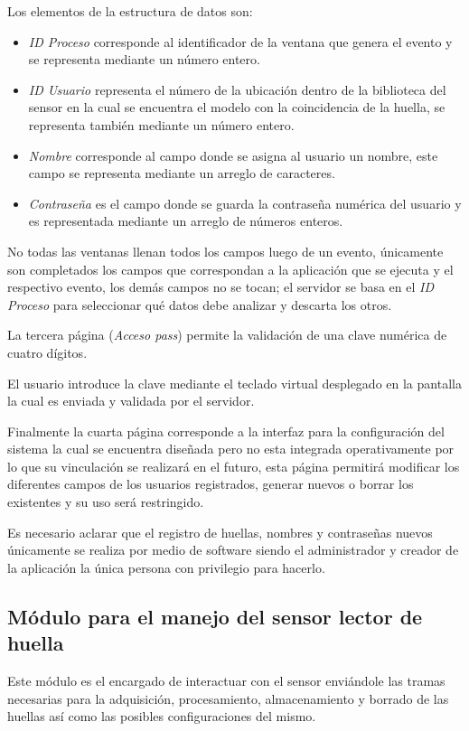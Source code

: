 Los elementos de la estructura de datos son:
\begin{itemize}
\item \textit{ID Proceso} corresponde al identificador de la ventana que genera el evento y se representa mediante un número entero.
\item \textit{ID Usuario} representa el número de la ubicación dentro de la biblioteca del sensor en la cual se encuentra el modelo con la coincidencia de la huella, se representa también mediante un número entero.
\item \textit{Nombre} corresponde al campo donde se asigna al usuario un nombre, este campo se representa mediante un arreglo de caracteres.
\item \textit{Contraseña} es el campo donde se guarda la contraseña numérica del usuario y es representada mediante un arreglo de números enteros.
\end{itemize}


No todas las ventanas llenan todos los campos luego de un evento, únicamente son completados los campos que correspondan a la aplicación que se ejecuta y el respectivo evento, los demás campos no se tocan; el servidor se basa en el \textit{ID Proceso} para seleccionar qué datos debe analizar y descarta los otros.

La tercera página (\textit{Acceso pass}) permite la validación de una clave numérica de cuatro dígitos.

El usuario introduce la clave mediante el teclado virtual desplegado en la pantalla	la cual es enviada y validada por el servidor.

Finalmente la cuarta página corresponde a la interfaz para la configuración del sistema la cual se encuentra diseñada pero no esta integrada operativamente por lo que su vinculación se realizará en el futuro, esta página permitirá modificar los diferentes campos de los usuarios registrados, generar nuevos o borrar los existentes y su uso será restringido.

Es necesario aclarar que el registro de huellas, nombres y contraseñas nuevos únicamente se realiza por medio de software siendo el administrador y creador de la aplicación la única persona con privilegio para hacerlo.   

\subsection{Módulo para el manejo del sensor lector de huella}

Este módulo es el encargado de interactuar con el sensor enviándole las tramas necesarias para la adquisición, procesamiento, almacenamiento y borrado de las huellas así como las posibles configuraciones del mismo.


